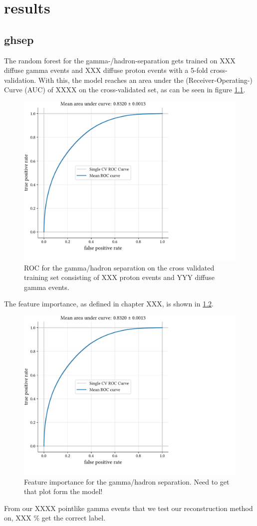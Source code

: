 \chapter{results}\label{results}

\section{ghsep}\label{ghsep}
The random forest for the gamma-/hadron-separation gets trained on 
XXX diffuse gamma events and XXX diffuse proton events with a 5-fold cross-validation.
With this, the model reaches an area under the (Receiver-Operating-) Curve (AUC) 
of XXXX on the cross-validated set, as can be seen in figure \ref{fig:gh_roc}.

\begin{figure}
    \centering
    \includegraphics[page=1, width=.8\textwidth]{../analysis/plots/cross_val_sep_perf_plot.pdf}
    \caption{ROC for the gamma/hadron separation on the cross validated training set 
    consisting of XXX proton events and YYY diffuse gamma events.}
    \label{fig:gh_roc}
\end{figure}

The feature importance, as defined in chapter XXX, is shown in \ref{fig:gh_features}.
\begin{figure}
    \centering
    \includegraphics[page=1, width=.8\textwidth]{../analysis/plots/cross_val_sep_perf_plot.pdf}
    \caption{Feature importance for the gamma/hadron separation. Need to get that plot form the model!}
    \label{fig:gh_features}
\end{figure}


From our XXXX pointlike gamma events that we test our reconstruction method on, 
XXX \% get the correct label.
